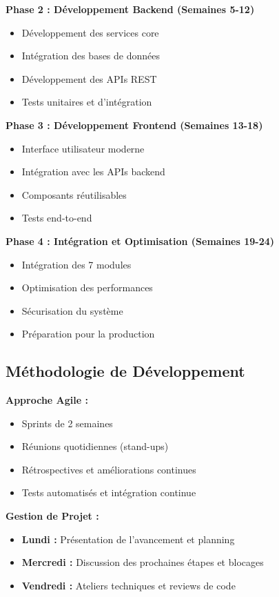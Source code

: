 \documentclass[a4paper,12pt]{article}
\begin{document}
\textbf{Phase 2 : Développement Backend (Semaines 5-12)}
\begin{itemize}
    \item Développement des services core
    \item Intégration des bases de données
    \item Développement des APIs REST
    \item Tests unitaires et d'intégration
\end{itemize}

\textbf{Phase 3 : Développement Frontend (Semaines 13-18)}
\begin{itemize}
    \item Interface utilisateur moderne
    \item Intégration avec les APIs backend
    \item Composants réutilisables
    \item Tests end-to-end
\end{itemize}

\textbf{Phase 4 : Intégration et Optimisation (Semaines 19-24)}
\begin{itemize}
    \item Intégration des 7 modules
    \item Optimisation des performances
    \item Sécurisation du système
    \item Préparation pour la production
\end{itemize}

\subsection*{Méthodologie de Développement}

\textbf{Approche Agile :}
\begin{itemize}
    \item Sprints de 2 semaines
    \item Réunions quotidiennes (stand-ups)
    \item Rétrospectives et améliorations continues
    \item Tests automatisés et intégration continue
\end{itemize}

\textbf{Gestion de Projet :}
\begin{itemize}
    \item \textbf{Lundi :} Présentation de l'avancement et planning
    \item \textbf{Mercredi :} Discussion des prochaines étapes et blocages
    \item \textbf{Vendredi :} Ateliers techniques et reviews de code
\end{itemize}
\end{document}
